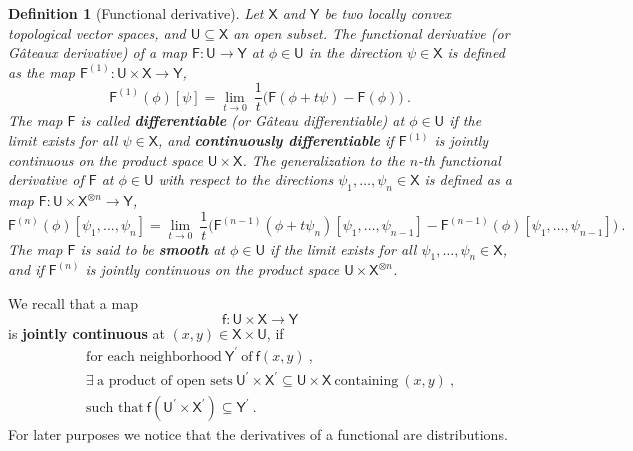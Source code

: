 \documentclass[11pt]{book}
\newcommand{\Fsf}{\mathsf{F}}
\newcommand{\Usf}{\mathsf{U}}
\newcommand{\Xsf}{\mathsf{X}}
\newcommand{\Ysf}{\mathsf{Y}}
\newcommand{\fsf}{\mathsf{f}}
\theoremstyle{break}
\newtheorem{definition}{Definition}[chapter]
\begin{document}
\begin{definition}[Functional derivative]\label{def:functional_derivative}
Let $\Xsf$ and $\Ysf$ be two locally convex topological vector spaces, and $\Usf \subseteq \Xsf$ an open subset. The functional derivative (or Gâteaux derivative) of a map $\Fsf:  \Usf \to \Ysf$ at $\phi \in \Usf$ in the direction $\psi \in \Xsf$ is defined as the map $\Fsf^{(1)} : \Usf \times \Xsf \to \Ysf$,
%
\begin{equation*}
\Fsf^{(1)}(\phi)[\psi] = \lim_{t \to 0} \ \frac{1}{t} \bigg( \Fsf(\phi + t \psi) - \Fsf(\phi) \bigg) \ .
\end{equation*}
% 
The map $\Fsf$ is called \textbf{differentiable} (or Gâteau differentiable) at $\phi \in \Usf$ if the limit exists for all $\psi \in \Xsf$, and \textbf{continuously differentiable} if $\Fsf^{(1)}$ is jointly continuous on the product space $\Usf \times \Xsf$.
%
%
The generalization to the $n$-th functional derivative of $\Fsf$ at $\phi \in \Usf$ with respect to the directions $\psi_1, \dots, \psi_n \in \Xsf$ is defined as a map $\Fsf : \Usf \times \Xsf^{\otimes n} \to \Ysf$,
%
\begin{equation*}
\Fsf^{(n)}(\phi)[\psi_1,\dots ,\psi_n] = \lim_{t \to 0} \ \frac{1}{t} \bigg( \Fsf^{(n-1)}(\phi + t \psi_n)[\psi_1,\dots ,\psi_{n-1}] - \Fsf^{(n-1)}(\phi)[\psi_1,\dots ,\psi_{n-1}] \bigg) \ .
\end{equation*}
%
The map $\Fsf$ is said to be \textbf{smooth} at $\phi \in \Usf$ if the limit exists for all $\psi_1, \dots, \psi_n \in \Xsf$, and if $\Fsf^{(n)}$ is jointly continuous on the product space $\Usf \times \Xsf^{\otimes n}$.
\end{definition}


We recall that a map 
%
\begin{equation*}
\fsf : \Usf \times \Xsf \to \Ysf
\end{equation*}
%
is \textbf{jointly continuous} at $(x,y) \in \Xsf \times \Usf$, if 
%
\begin{eqnarray*}
&& \mbox{for each neighborhood} \ \Ysf^\prime \ \mbox{of} \ \fsf(x,y) \ , \\
&& \exists \ \mbox{a product of open sets} \ \Usf^\prime \times \Xsf^\prime \subseteq \Usf \times \Xsf \ \mbox{containing} \ (x,y) \ , \\
&& \mbox{such that} \ \fsf(\Usf^\prime \times \Xsf^\prime) \subseteq \Ysf^\prime \ .
\end{eqnarray*}
%
For later purposes we notice that the derivatives of a functional are distributions.
\end{document}
